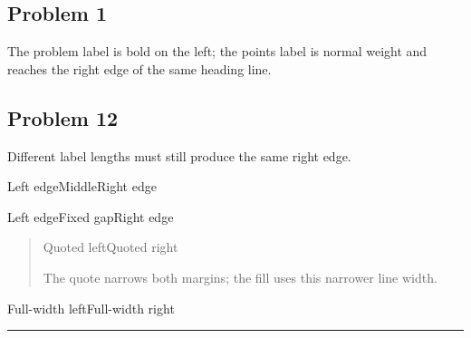 \documentclass[11pt]{article}
\newcommand{\problem}[2]{\subsection*{Problem #1\hfill\normalfont[#2 points]}}
\begin{document}
\pagestyle{empty}
\problem{1}{4}
The problem label is bold on the left; the points label is normal weight
and reaches the right edge of the same heading line.
\problem{12}{15}
Different label lengths must still produce the same right edge.

\noindent Left edge\hfill Middle\hfill Right edge\par
\noindent Left edge\hspace{1em}Fixed gap\hfill Right edge\par
\begin{quote}
Quoted left\hfill Quoted right\par
The quote narrows both margins; the fill uses this narrower line width.
\end{quote}
\noindent Full-width left\hfill Full-width right\par
\hrule
\end{document}
